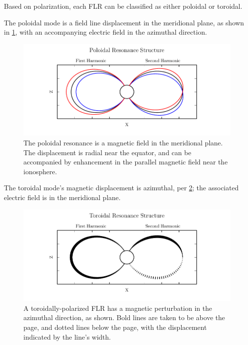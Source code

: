 Based on polarization, each FLR can be classified as either poloidal or toroidal. 

The poloidal mode is a field line displacement in the meridional plane, as shown in \cref{fig_poloidal}, with an accompanying electric field in the azimuthal direction. 

\begin{figure}[!htb]
    \centering
    \includegraphics[width=\textwidth]{figures/poloidal.pdf}
    \caption[Poloidal Mode Structure]{
      The poloidal resonance is a magnetic field in the meridional plane. The displacement is radial near the equator, and can be accompanied by enhancement in the parallel magnetic field near the ionosphere. 
    }
    \label{fig_poloidal}
\end{figure}

The toroidal mode's magnetic displacement is azimuthal, per \cref{fig_toroidal}; the associated electric field is in the meridional plane. 

\begin{figure}[!htb]
    \centering
    \includegraphics[width=\textwidth]{figures/toroidal.pdf}
    \caption[Toroidal Mode Structure]{
      A toroidally-polarized FLR has a magnetic perturbation in the azimuthal direction, as shown. Bold lines are taken to be above the page, and dotted lines below the page, with the displacement indicated by the line's width. 
    }
    \label{fig_toroidal}
\end{figure}

